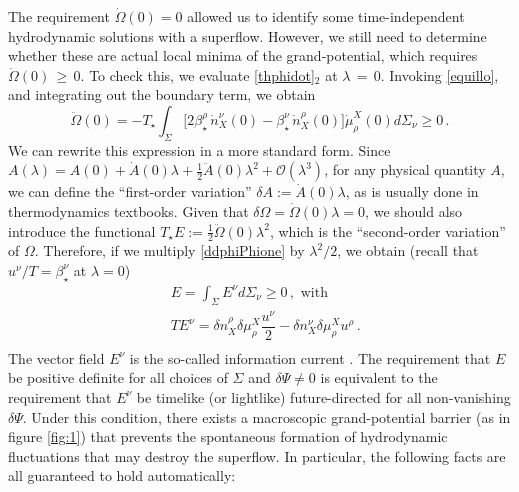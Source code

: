 \documentclass[a4paper, amsfonts, amssymb, amsmath, reprint, showkeys, nofootinbib, twoside,notitlepage,onecolumn]{revtex4-2}
\theoremstyle{definition}
\theoremstyle{theorem}
\theoremstyle{corollary}
\begin{document}
The requirement $\dot{\Omega}(0)=0$ allowed us to identify some time-independent hydrodynamic solutions with a superflow. However, we still need to determine whether these are actual local minima of the grand-potential, which requires $\ddot{\Omega}(0)\,{\geq}\, 0$. 
To check this, we evaluate \eqref{thphidot}$_2$ at $\lambda\,{=}\, 0$. Invoking \eqref{equillo}, and integrating out the boundary term, we obtain
\begin{equation}\label{ddphiPhione}
\ddot{\Omega}(0) =-T_\star \int_\Sigma \big[2\beta^{\rho}_\star \,  \dot{n}^{\nu}_X(0){-}\beta^{\nu}_\star \, \dot{n}^{\rho}_X(0) \big] \dot{\mu}_\rho^X (0)d\Sigma_\nu \geq 0 \, .
\end{equation}
We can rewrite this expression in a more standard form. Since $A(\lambda)=A(0)+ \dot{A}(0)\lambda +\frac{1}{2}\ddot{A}(0)\lambda^2+\mathcal{O}(\lambda^3)$, for any physical quantity $A$, we can define the ``first-order variation'' $\delta A:=\dot{A}(0)\lambda$, as is usually done in thermodynamics textbooks. Given that $\delta \Omega =\dot{\Omega}(0)\lambda=0$, we should also introduce the functional $T_\star E:=\frac{1}{2}\ddot{\Omega}(0)\lambda^2$, which is the ``second-order variation'' of $\Omega$. Therefore, if we multiply \eqref{ddphiPhione} by $\lambda^2/2$, we obtain (recall that $u^\nu/T {=}\beta_\star^\nu$ at $\lambda{=}0$)
\begin{equation}\label{againinfona}
\begin{split}
& E=\int_\Sigma E^\nu d\Sigma_\nu \geq 0 \, , \text{ with }\\
& T E^\nu = \delta n^\rho_X \delta \mu^X_\rho \dfrac{u^\nu}{2} -\delta n^\nu_X \delta \mu_\rho^X u^\rho \, .\\
\end{split}
\end{equation}
The vector field $E^\nu$ is the so-called information current \cite{GavassinoCausality2021}. The requirement that $E$ be positive definite for all choices of $\Sigma$ and $\delta \Psi\neq 0$ is equivalent to the requirement that $E^\nu$ be timelike (or lightlike) future-directed for all non-vanishing $\delta \Psi$. Under this condition, there exists a macroscopic grand-potential barrier (as in figure \ref{fig:1}) that prevents the spontaneous formation of hydrodynamic fluctuations that may destroy the superflow. In particular, the following facts are all guaranteed to hold automatically:
\end{document}
